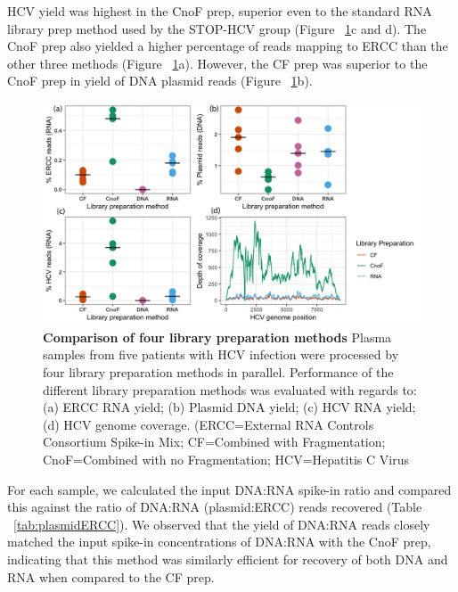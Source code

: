 HCV yield was highest in the CnoF prep, superior even to the standard RNA library prep method used by the STOP-HCV group (Figure ~\ref{fig:Fig4libprep}c and d). The CnoF prep also yielded a higher percentage of reads mapping to ERCC than the other three methods (Figure ~\ref{fig:Fig4libprep}a). However, the CF prep was superior to the CnoF prep in yield of DNA plasmid reads (Figure ~\ref{fig:Fig4libprep}b).

\FloatBarrier
\newpage
\begin{figure}
\centering
\includegraphics[width=\textwidth, scale=0.9]{./Results1/Images/libprep.png}
\caption[Comparison of four library preparation methods]{\textbf{Comparison of four library preparation methods} Plasma samples from five patients with HCV infection were processed by four library preparation methods in parallel. Performance of the different library preparation methods was evaluated with regards to: (a) ERCC RNA yield; (b) Plasmid DNA yield; (c) HCV RNA yield; (d) HCV genome coverage. (ERCC=External RNA Controls Consortium Spike-in Mix; CF=Combined with Fragmentation; CnoF=Combined with no Fragmentation; HCV=Hepatitis C Virus}
\label{fig:Fig4libprep}


\end{figure}
\FloatBarrier



For each sample, we calculated the input DNA:RNA spike-in ratio and compared this against the ratio of DNA:RNA (plasmid:ERCC) reads recovered (Table ~\ref{tab:plasmidERCC}). We observed that the yield of DNA:RNA reads closely matched the input spike-in concentrations of DNA:RNA with the CnoF prep, indicating that this method was similarly efficient for recovery of both DNA and RNA when compared to the CF prep.

